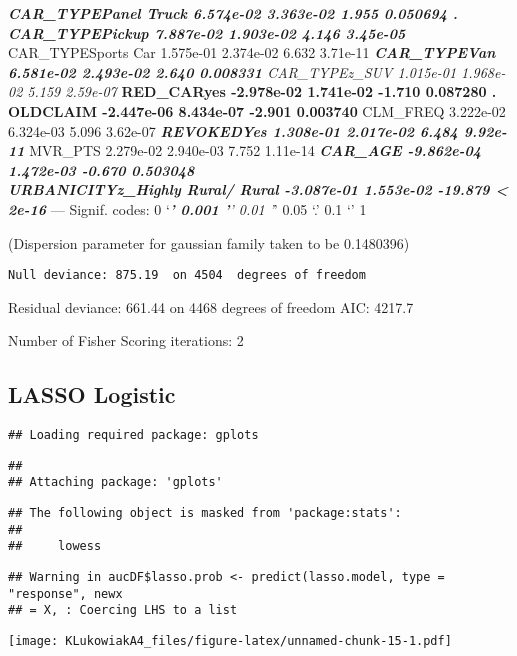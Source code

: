\documentclass[]{article}
\begin{document}
\textbf{\emph{ CAR\_TYPEPanel Truck 6.574e-02 3.363e-02 1.955 0.050694
.\\
CAR\_TYPEPickup 7.887e-02 1.903e-02 4.146 3.45e-05 }} CAR\_TYPESports
Car 1.575e-01 2.374e-02 6.632 3.71e-11 \emph{\textbf{ CAR\_TYPEVan
6.581e-02 2.493e-02 2.640 0.008331 } CAR\_TYPEz\_SUV 1.015e-01 1.968e-02
5.159 2.59e-07 }\textbf{ RED\_CARyes -2.978e-02 1.741e-02 -1.710
0.087280 .\\
OLDCLAIM -2.447e-06 8.434e-07 -2.901 0.003740 } CLM\_FREQ 3.222e-02
6.324e-03 5.096 3.62e-07 \textbf{\emph{ REVOKEDYes 1.308e-01 2.017e-02
6.484 9.92e-11 }} MVR\_PTS 2.279e-02 2.940e-03 7.752 1.11e-14
\textbf{\emph{ CAR\_AGE -9.862e-04 1.472e-03 -0.670 0.503048\\
URBANICITYz\_Highly Rural/ Rural -3.087e-01 1.553e-02 -19.879
\textless{} 2e-16 }} --- Signif. codes: 0 `\emph{\textbf{' 0.001 '}'
0.01 '}' 0.05 `.' 0.1 `' 1

(Dispersion parameter for gaussian family taken to be 0.1480396)

\begin{verbatim}
Null deviance: 875.19  on 4504  degrees of freedom
\end{verbatim}

Residual deviance: 661.44 on 4468 degrees of freedom AIC: 4217.7

Number of Fisher Scoring iterations: 2

\hypertarget{lasso-logistic}{%
\subsection{LASSO Logistic}\label{lasso-logistic}}

\begin{verbatim}
## Loading required package: gplots
\end{verbatim}

\begin{verbatim}
## 
## Attaching package: 'gplots'
\end{verbatim}

\begin{verbatim}
## The following object is masked from 'package:stats':
## 
##     lowess
\end{verbatim}

\begin{verbatim}
## Warning in aucDF$lasso.prob <- predict(lasso.model, type = "response", newx
## = X, : Coercing LHS to a list
\end{verbatim}

\texttt{[image: KLukowiakA4\_files/figure-latex/unnamed-chunk-15-1.pdf]}
\end{document}
